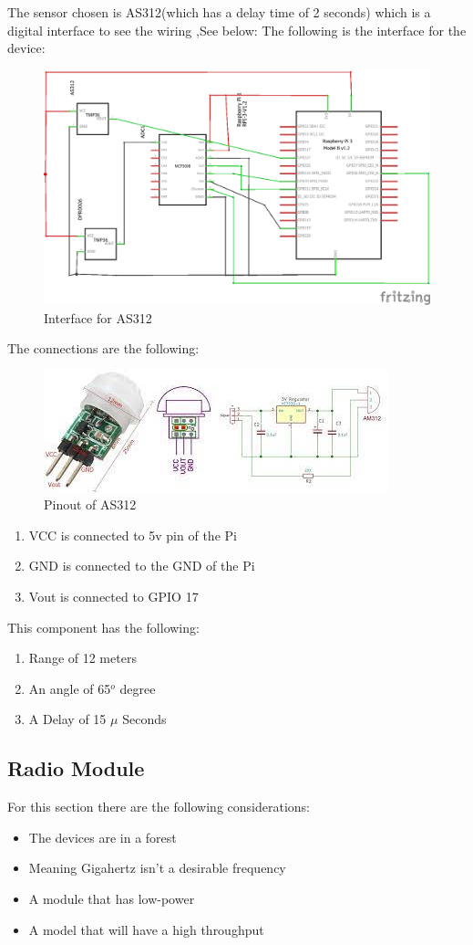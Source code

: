 The sensor chosen is AS312\cite{micros}(which has a delay time of 2 seconds) which is a digital interface to see the wiring ,See below:
\newpage
The following is the interface for the device:

\begin{figure}[h!]
	\begin{center}
		\includegraphics[width=0.5\linewidth]{Images/interfaceofAS312.png}
	\caption{Interface for AS312}
	\label{Interface for AS312}
	\end{center}

\end{figure}
The connections are the following:
\begin{figure}[h!]
	\centering
	\includegraphics[width=0.5\linewidth]{Images/pinout_of_AS312.jpg}
	\caption*{Pinout of  AS312}
	\label{Pinout of  AS312}
\end{figure}
\begin{enumerate}
	\item VCC is connected  to 5v pin of the Pi
	\item GND is connected to the GND of the  Pi
	\item Vout is connected to GPIO 17
\end{enumerate}
This  component has the following:
\begin{enumerate}
	\item Range  of 12 meters 
	\item An  angle  of  65$^o$ degree
	\item A Delay of 15 $\mu$ Seconds
\end{enumerate}

\newpage
\subsection{Radio Module}
For this section there are the following considerations:
\begin{itemize}
	\item The devices are in a forest
	\item Meaning  Gigahertz  isn't  a desirable frequency
	\item A module that has low-power
	\item A model that  will have a high throughput 
\end{itemize}

